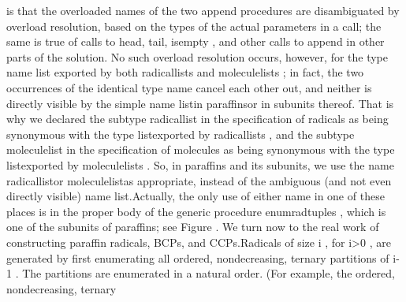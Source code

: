 is that the overloaded names of the two \tyxffmxmono[]append%
\tyxffmxendmono[] procedures are disambiguated by overload resolution,
based on the types of the actual parameters in a call; the same is
true of calls to \tyxffmxmono[]head\tyxffmxendmono[], %
\tyxffmxmono[]tail\tyxffmxendmono[], \tyxffmxmono[]is\Symuns[]empty%
\tyxffmxendmono[], and other calls to \tyxffmxmono[]append%
\tyxffmxendmono[] in other parts of the solution. No such overload
resolution occurs, however, for the type name \tyxffmxmono[]list%
\tyxffmxendmono[] exported by both \tyxffmxmono[]radical\Symuns[]lists%
\tyxffmxendmono[] and \tyxffmxmono[]molecule\Symuns[]lists%
\tyxffmxendmono[]; in fact, the two occurrences of the identical type
name cancel each other out, and neither is directly visible by the
simple name \tyxffmxmono[]list\tyxffmxendmono[] in %
\tyxffmxmono[]paraffins\tyxffmxendmono[] or in subunits thereof. That
is why we declared the subtype \tyxffmxmono[]radical\Symuns[]list%
\tyxffmxendmono[] in the specification of \tyxffmxmono[]radicals%
\tyxffmxendmono[] as being synonymous with the type %
\tyxffmxmono[]list\tyxffmxendmono[] exported by \tyxffmxmono[]radical\Symuns[]lists%
\tyxffmxendmono[], and the subtype \tyxffmxmono[]molecule\Symuns[]list%
\tyxffmxendmono[] in the specification of \tyxffmxmono[]molecules%
\tyxffmxendmono[] as being synonymous with the type %
\tyxffmxmono[]list\tyxffmxendmono[] exported by \tyxffmxmono[]molecule\Symuns[]lists%
\tyxffmxendmono[]. So, in \tyxffmxmono[]paraffins%
\tyxffmxendmono[] and its subunits, we use the name %
\tyxffmxmono[]radical\Symuns[]list\tyxffmxendmono[] or %
\tyxffmxmono[]molecule\Symuns[]list\tyxffmxendmono[] as appropriate,
instead of the ambiguous (and not even directly visible) name %
\tyxffmxmono[]list\tyxffmxendmono[].\NtFoot[]\NtNtpar[]Actually, the
only use of either name in one of these places is in the proper body
of the generic procedure \tyxffmxmono[]enum\Symuns[]rad\Symuns[]tuples%
\tyxffmxendmono[], which is one of the subunits of %
\tyxffmxmono[]paraffins\tyxffmxendmono[]; see Figure .%
\NtEndntpar[]\NtEndfoot[]\Endpara[]
\Para[]We turn now to the real work of constructing paraffin radicals,
BCPs, and CCPs.\Endpara[]
\Para[]Radicals of size \InlEqn[]\LmthEqn[]i
\LmthEndeqn[]\EndInlEqn[], for \InlEqn[]\LmthEqn[]i>0
\LmthEndeqn[]%
\EndInlEqn[], are generated by first enumerating all ordered, nondecreasing,
ternary partitions of \InlEqn[]\LmthEqn[]i-1
\LmthEndeqn[]\EndInlEqn[]. The partitions are enumerated
in a natural order. (For example, the ordered, nondecreasing, ternary

